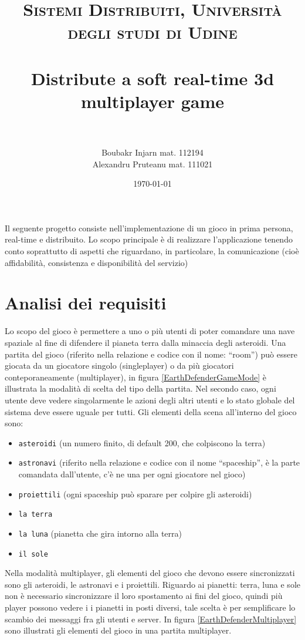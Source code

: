 \documentclass[paper=a4, fontsize=11pt]{scrartcl} %
\title{	
\normalfont \normalsize 
\textsc{Sistemi Distribuiti, Università degli studi di Udine} \\ [25pt] %
\horrule{0.5pt} \\[0.4cm] %
\huge Distribute a soft real-time 3d multiplayer game\\%
\horrule{2pt} \\[0.5cm] %
}
\author{Boubakr Injarn mat. 112194\\Alexandru Pruteanu mat. 111021} %
\date{\normalsize\today} %
\numberwithin{equation}{section} %
\numberwithin{figure}{section} %
\numberwithin{table}{section} %
\begin{document}
\maketitle %
\newpage
\tableofcontents
\listoffigures
\newpage
\textbf{\abstractname}

Il seguente progetto consiste nell'implementazione di un gioco in prima persona,
real-time e distribuito. Lo scopo principale è di realizzare l'applicazione tenendo
conto soprattutto di aspetti che riguardano, in particolare, la comunicazione
(cioè affidabilità, consistenza e disponibilità del servizio)

\section{Analisi dei requisiti}
Lo scopo del gioco è permettere a uno o più utenti di poter comandare una nave spaziale al fine di difendere il pianeta terra dalla minaccia degli asteroidi.
Una partita del gioco (riferito nella relazione e codice con il nome: ``room'') può essere giocata da un giocatore singolo (singleplayer) o da più
giocatori conteporaneamente (multiplayer), in figura \ref{EarthDefenderGameMode} è illustrata la modalità di scelta del tipo della partita.
Nel secondo caso, ogni utente deve vedere singolarmente le azioni degli altri utenti e lo stato globale del sistema deve essere uguale per tutti.
Gli elementi della scena all'interno del gioco sono:
\begin{itemize}
\item \texttt{asteroidi} (un numero finito, di default 200, che colpiscono la terra)
\item \texttt{astronavi} (riferito nella relazione e codice con il nome ``spaceship'', è la parte comandata dall'utente, c'è ne una per ogni giocatore nel gioco)
\item \texttt{proiettili} (ogni spaceship può sparare per colpire gli asteroidi) 
\item \texttt{la terra}
\item \texttt{la luna} (pianetta che gira intorno alla terra)
\item \texttt{il sole}
\end{itemize}

Nella modalità multiplayer, gli elementi del gioco che devono essere sincronizzati sono gli asteroidi, le astronavi e i proiettili.
Riguardo ai pianetti: terra, luna e sole non è necessario sincronizzare il loro spostamento ai fini del gioco, quindi più player possono vedere
i i pianetti in posti diversi, tale scelta è per semplificare
lo scambio dei messaggi fra gli utenti e server. In figura \ref{EarthDefenderMultiplayer} sono illustrati gli elementi del gioco in una partita multiplayer.
\end{document}
